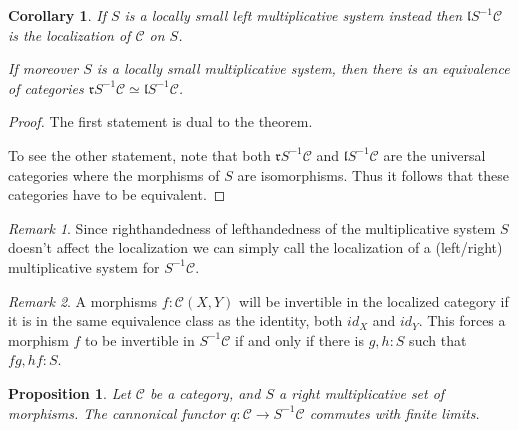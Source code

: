 \documentclass[12pt]{article}
\newtheorem{corollary}{Corollary}[theorem]
\newtheorem{prop}[theorem]{Proposition}
\theoremstyle{definition}
\theoremstyle{remark}
\newtheorem*{remark}{Remark}
\begin{document}
            \begin{corollary}
                If $S$ is a locally small left multiplicative system instead then $\mathfrak{l}S^{-1}\mathcal{C}$ is the localization of $\mathcal{C}$ on $S$.

                If moreover $S$ is a locally small multiplicative system, then there is an equivalence of categories $\mathfrak{r}S^{-1}\mathcal{C}\simeq\mathfrak{l}S^{-1}\mathcal{C}$.
            \end{corollary}

            \begin{proof}
                The first statement is dual to the theorem.

                To see the other statement, note that both $\mathfrak{r}S^{-1}\mathcal{C}$ and $\mathfrak{l}S^{-1}\mathcal{C}$ are the universal categories where the morphisms of $S$ are isomorphisms. Thus it follows that these categories have to be equivalent.
            \end{proof}

            \begin{remark}
                Since righthandedness of lefthandedness of the multiplicative system $S$ doesn't affect the localization we can simply call the localization of a (left/right) multiplicative system for $S^{-1}\mathcal{C}$.
            \end{remark}

            \begin{remark}
                A morphisms $f:\mathcal{C}(X,Y)$ will be invertible in the localized category if it is in the same equivalence class as the identity, both $id_X$ and $id_Y$. This forces a morphism $f$ to be invertible in $S^{-1}\mathcal{C}$ if and only if there is $g,h:S$ such that $fg,hf:S$.
            \end{remark}

            \begin{prop}
                Let $\mathcal{C}$ be a category, and $S$ a right multiplicative set of morphisms. The cannonical functor $q:\mathcal{C}\rightarrow S^{-1}\mathcal{C}$ commutes with finite limits.
            \end{prop}
\end{document}
